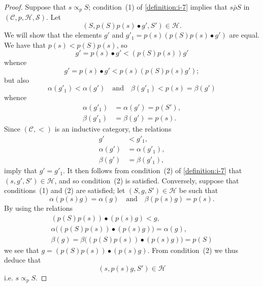 \documentclass[a4paper,fleqn]{article}
\theoremstyle{plain}
\theoremstyle{definition}
\newcommand{\oldpage}[1]{{\marginpar{\footnotesize$\bigg\vert$\,\,\,\,\textit{p.~#1}}}}
\newcommand{\textand}{\quad\text{and}\quad}
\newcommand{\CC}{\mathcal{C}}
\newcommand{\HH}{\mathcal{H}}
\renewcommand{\SS}{\mathcal{S}}
\newcommand{\relrhobar}{\mathrel{\bar{\rho}}}
\newcommand{\subs}{\mathrel{\propto}}
\begin{document}
\begin{proof}
  Suppose that $s\subs_p S$;
  condition~(1) of \cref{definition:i-7} implies that $s\relrhobar S$ in $(\CC,p,\HH,\SS)$.
  Let
  \[
    (S,p(S)p(s)\bullet g',S')\in\HH.
  \]
  We will show that the elements $g'$ and $g'_1=p(s)(p(S)p(s)\bullet g')$ are equal.
  We have that $p(s)<p(S)p(s)$, so
  \[
    g'
    = p(s)\bullet g'
    < (p(S)p(s))g'
  \]
  whence
  \[
    g'
    = p(s)\bullet g'
    < p(s)(p(S)p(s)g');
  \]
  \oldpage{361}
  but also
  \[
    \alpha(g'_1)<\alpha(g')
    \textand
    \beta(g'_1)<p(s)=\beta(g')
  \]
  whence
  \[
    \begin{aligned}
      \alpha(g'_1)
      &= \alpha(g')
      = p(S'),
    \\\beta(g'_1)
      &= \beta(g')
      = p(s).
    \end{aligned}
  \]
  Since $(\CC,<)$ is an inductive category, the relations
  \[
    \begin{aligned}
      g'
      &< g'_1,
    \\\alpha(g')
      &= \alpha(g'_1),
    \\\beta(g')
      &= \beta(g'_1),
    \end{aligned}
  \]
  imply that $g'=g'_1$.
  It then follows from condition~(2) of \cref{definition:i-7} that $(s,g',S')\in\HH$, and so condition~(2\textquotesingle) is satisfied.
  Conversely, suppose that conditions~(1\textquotesingle) and (2\textquotesingle) are satisfied;
  let $(S,g,S')\in\HH$ be such that
  \[
    \alpha(p(s)g)=\alpha(g)
    \textand
    \beta(p(s)g)=p(s).
  \]
  By using the relations
  \[
    \begin{gathered}
      (p(S)p(s))\bullet(p(s)g)<g,
    \\\alpha\big((p(S)p(s))\bullet(p(s)g)\big)=\alpha(g),
    \\\beta(g)=\beta\big((p(S)p(s))\bullet(p(s)g)\big)=p(S)
    \end{gathered}
  \]
  we see that $g=(p(S)p(s))\bullet(p(s)g)$.
  From condition~(2\textquotesingle) we thus deduce that
  \[
    (s,p(s)g,S')\in\HH
  \]
  i.e. $s\subs_p S$.
\end{proof}
\end{document}
